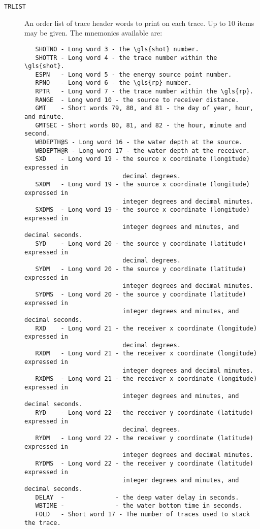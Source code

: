 \begin{description}
\item[\texttt{TRLIST}] An order list of trace header words to print on each trace.
         Up to 10 items may be given.  The mnemonics available are:
\begin{verbatim}
   SHOTNO - Long word 3 - the \gls{shot} number.
   SHOTTR - Long word 4 - the trace number within the \gls{shot}.
   ESPN   - Long word 5 - the energy source point number.
   RPNO   - Long word 6 - the \gls{rp} number.
   RPTR   - Long word 7 - the trace number within the \gls{rp}.
   RANGE  - Long word 10 - the source to receiver distance.
   GMT    - Short words 79, 80, and 81 - the day of year, hour, and minute.
   GMTSEC - Short words 80, 81, and 82 - the hour, minute and second.
   WBDEPTH@S - Long word 16 - the water depth at the source.
   WBDEPTH@R - Long word 17 - the water depth at the receiver.
   SXD    - Long word 19 - the source x coordinate (longitude) expressed in
                           decimal degrees.
   SXDM   - Long word 19 - the source x coordinate (longitude) expressed in
                           integer degrees and decimal minutes.
   SXDMS  - Long word 19 - the source x coordinate (longitude) expressed in
                           integer degrees and minutes, and decimal seconds.
   SYD    - Long word 20 - the source y coordinate (latitude) expressed in
                           decimal degrees.
   SYDM   - Long word 20 - the source y coordinate (latitude) expressed in
                           integer degrees and decimal minutes.
   SYDMS  - Long word 20 - the source y coordinate (latitude) expressed in
                           integer degrees and minutes, and decimal seconds.
   RXD    - Long word 21 - the receiver x coordinate (longitude) expressed in
                           decimal degrees.
   RXDM   - Long word 21 - the receiver x coordinate (longitude) expressed in
                           integer degrees and decimal minutes.
   RXDMS  - Long word 21 - the receiver x coordinate (longitude) expressed in
                           integer degrees and minutes, and decimal seconds.
   RYD    - Long word 22 - the receiver y coordinate (latitude) expressed in
                           decimal degrees.
   RYDM   - Long word 22 - the receiver y coordinate (latitude) expressed in
                           integer degrees and decimal minutes.
   RYDMS  - Long word 22 - the receiver y coordinate (latitude) expressed in
                           integer degrees and minutes, and decimal seconds.
   DELAY  -              - the deep water delay in seconds.
   WBTIME -              - the water bottom time in seconds.
   FOLD   - Short word 17 - The number of traces used to stack the trace.
\end{verbatim}


\end{description}
